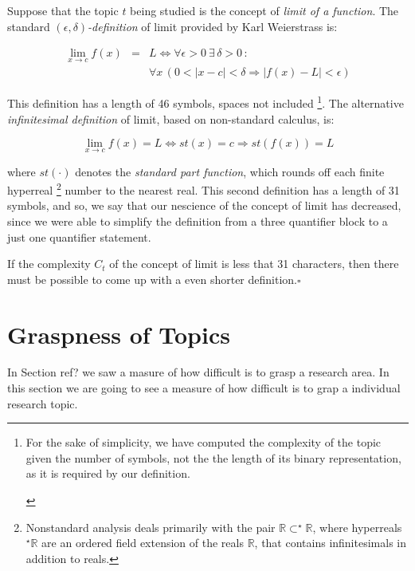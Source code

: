 \begin{example}
Suppose that the topic $t$ being studied is the concept of \emph{limit
of a function}. The standard \emph{$\left(\epsilon,\delta\right)$-definition
}of limit provided by Karl Weierstrass is:

\begin{eqnarray*}
\lim_{x\rightarrow c}f(x) & = & L\Leftrightarrow\forall\epsilon>0\:\exists\,\delta>0\,:\,\\
 &  & \forall x\,\left(0<\left|x-c\right|<\delta\Rightarrow\left|f(x)-L\right|<\epsilon\right)
\end{eqnarray*}


This definition has a length of 46 symbols, spaces not included%
\footnote{\begin{example}
For the sake of simplicity, we have computed the complexity of the
topic given the number of symbols, not the the length of its binary
representation, as it is required by our definition.\end{example}
%
}. The alternative \emph{infinitesimal definition} of limit, based
on non-standard calculus, is:

\[
\lim_{x\rightarrow c}f(x)=L\Leftrightarrow st(x)=c\Rightarrow st(f(x))=L
\]


where $st(\cdot)$ denotes the \emph{standard part function}, which
\textquotedbl{}rounds off\textquotedbl{} each finite hyperreal%
\footnote{Nonstandard analysis deals primarily with the pair $\mathbb{R\subset^{\star}\mathbb{R}}$,
where hyperreals $^{\star}\mathbb{R}$ are an ordered field extension
of the reals $\mathbb{R}$, that contains infinitesimals in addition
to reals.%
} number to the nearest real. This second definition has a length of
31 symbols, and so, we say that our nescience of the concept of limit
has decreased, since we were able to simplify the definition from
a three quantifier block to a just one quantifier statement.

If the complexity $C_{t}$ of the concept of limit is less that 31
characters, then there must be possible to come up with a even shorter
definition.\hfill{}$\square$
\end{example}

%
%

\section{Graspness of Topics}

In Section {\color{red} ref?} we saw a masure of how difficult is to grasp a research area. In this section we are going to see a measure of how difficult is to grap a individual research topic.

